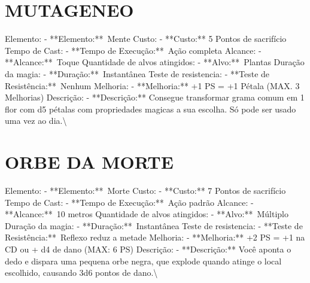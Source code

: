 \documentclass{article}%
\begin{document}
\section{MUTAGENEO}%
\label{sec:MUTAGENEO}%
Elemento: {-} **Elemento:**~Mente\newline%
Custo: {-} **Custo:** 5 Pontos de sacrifício\newline%
Tempo de Cast: {-} **Tempo de Execução:**~Ação completa\newline%
Alcance: {-} **Alcance:**~Toque\newline%
Quantidade de alvos atingidos: {-} **Alvo:**~Plantas\newline%
Duração da magia: {-} **Duração:**~Instantânea\newline%
Teste de resistencia: {-} **Teste de Resistência:**~Nenhum\newline%
Melhoria: {-} **Melhoria:** +1 PS = +1 Pétala (MAX. 3 Melhorias)\newline%
Descrição: {-} **Descrição:** Consegue transformar grama comum em 1 flor com d5 pétalas com propriedades magicas a sua escolha. Só pode ser usado uma vez ao dia.\textbackslash{}

%
\section{ORBE DA MORTE}%
\label{sec:ORBEDAMORTE}%
Elemento: {-} **Elemento:**~Morte\newline%
Custo: {-} **Custo:** 7 Pontos de sacrifício\newline%
Tempo de Cast: {-} **Tempo de Execução:**~Ação padrão\newline%
Alcance: {-} **Alcance:**~10 metros\newline%
Quantidade de alvos atingidos: {-} **Alvo:**~Múltiplo\newline%
Duração da magia: {-} **Duração:**~Instantânea\newline%
Teste de resistencia: {-} **Teste de Resistência:**~Reflexo reduz a metade\newline%
Melhoria: {-} **Melhoria:** +2 PS = +1 na CD ou + d4 de dano (MAX: 6 PS)\newline%
Descrição: {-} **Descrição:** Você aponta o dedo e dispara uma pequena orbe negra, que explode quando atinge o local escolhido, causando 3d6 pontos de dano.\textbackslash{}

%
\end{document}
